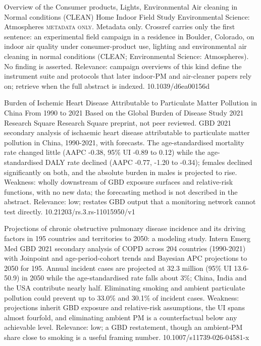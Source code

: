 \documentclass[10pt]{article}
\begin{document}
{Overview of the Consumer products, Lights, Environmental Air cleaning in Normal conditions (CLEAN) Home Indoor Field Study}
{Environmental Science: Atmospheres}
{\textsc{metadata only.} Metadata only. Crossref carries only the first sentence: an experimental field campaign in a residence in Boulder, Colorado, on indoor air quality under consumer-product use, lighting and environmental air cleaning in normal conditions (CLEAN; Environmental Science: Atmospheres). No finding is asserted. Relevance: campaign overviews of this kind define the instrument suite and protocols that later indoor-PM and air-cleaner papers rely on; retrieve when the full abstract is indexed.}
{10.1039/d6ea00156d}

\par{}\baselineskip{}\baselineskip
{}

{Burden of Ischemic Heart Disease Attributable to Particulate Matter Pollution in China From 1990 to 2021 Based on the Global Burden of Disease Study 2021}
{Research Square}
{Research Square preprint, not peer reviewed. GBD 2021 secondary analysis of ischaemic heart disease attributable to particulate matter pollution in China, 1990-2021, with forecasts. The age-standardised mortality rate changed little (AAPC -0.38, 95\% UI -0.89 to 0.12) while the age-standardised DALY rate declined (AAPC -0.77, -1.20 to -0.34); females declined significantly on both, and the absolute burden in males is projected to rise. Weakness: wholly downstream of GBD exposure surfaces and relative-risk functions, with no new data; the forecasting method is not described in the abstract. Relevance: low; restates GBD output that a monitoring network cannot test directly.}
{10.21203/rs.3.rs-11015950/v1}

{Projections of chronic obstructive pulmonary disease incidence and its driving factors in 195 countries and territories to 2050: a modeling study.}
{Intern Emerg Med}
{GBD 2021 secondary analysis of COPD across 204 countries (1990-2021) with Joinpoint and age-period-cohort trends and Bayesian APC projections to 2050 for 195. Annual incident cases are projected at 32.3 million (95\% UI 13.6-50.9) in 2050 while the age-standardised rate falls about 3\%; China, India and the USA contribute nearly half. Eliminating smoking and ambient particulate pollution could prevent up to 33.0\% and 30.1\% of incident cases. Weakness: projections inherit GBD exposure and relative-risk assumptions, the UI spans almost fourfold, and eliminating ambient PM is a counterfactual below any achievable level. Relevance: low; a GBD restatement, though an ambient-PM share close to smoking is a useful framing number.}
{10.1007/s11739-026-04581-x}
\end{document}
